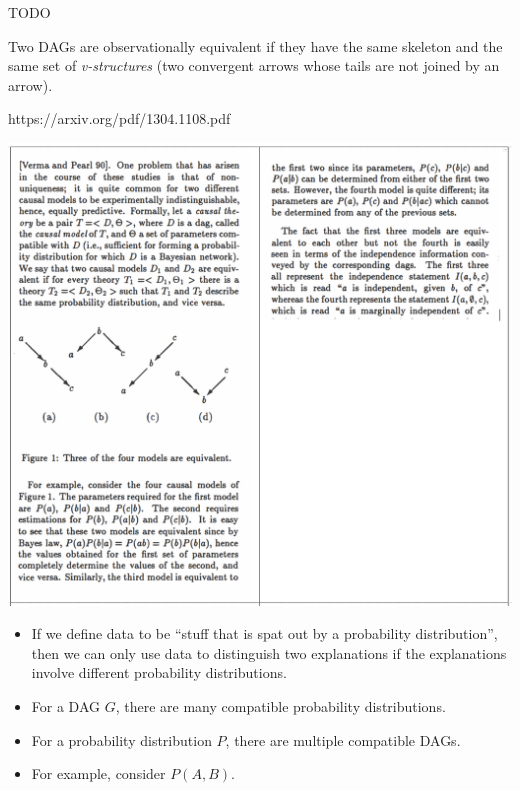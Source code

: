 \begin{definition}
  TODO
\end{definition}

\begin{theorem}
  Two DAGs are observationally equivalent if they have the same skeleton and the same set of {\it v-structures} (two
  convergent arrows whose tails are not joined by an arrow).
\end{theorem}

https://arxiv.org/pdf/1304.1108.pdf

\includegraphics[width=400pt]{img/statistics-and-machine-learning--pearl--conditional-independence-and-graphoids-39eb.png}


\begin{intuition}
  \begin{itemize}
  \item If we define data to be ``stuff that is spat out by a probability distribution​'', then we can only use data
    to distinguish two explanations if the explanations involve different probability distributions.
  \item For a DAG $G$, there are many compatible probability distributions.
  \item For a probability distribution $P$, there are multiple compatible DAGs.
  \item For example, consider $P(A, B)$.
  \end{itemize}
\end{intuition}

